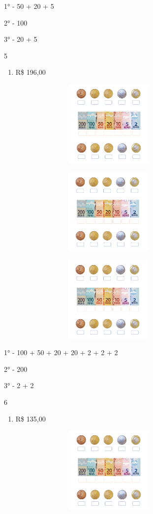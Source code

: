 {{{{{{{{{1° - 50 + 20 + 5

2° - 100

3° - 20 + 5

\num{5}

\begin{enumerate}
\def\labelenumi{\alph{enumi})}
\item
  R\$ 196,00
\end{enumerate}

\includegraphics[width=4.45833in,height=1.68116in]{media/image72.png}

\includegraphics[width=4.40625in,height=1.66152in]{media/image72.png}

\includegraphics[width=4.40625in,height=1.66152in]{media/image72.png}

1° - 100 + 50 + 20 + 20 + 2 + 2 + 2

2° - 200

3° - 2 + 2

\num{6}

\begin{enumerate}
\def\labelenumi{\alph{enumi})}
\item
  R\$ 135,00
\end{enumerate}

\includegraphics[width=4.45833in,height=1.68116in]{media/image72.png}

}}}}}}}}}

